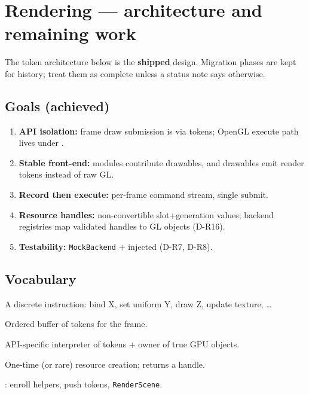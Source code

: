 \section{Rendering --- architecture and remaining work}
\label{sec:rendering-target}

The token architecture below is the \textbf{shipped} design. Migration phases
are kept for history; treat them as complete unless a status note says otherwise.

\subsection{Goals (achieved)}
\begin{enumerate}
  \item \textbf{API isolation:} frame draw submission is via tokens; OpenGL
        execute path lives under .
  \item \textbf{Stable front-end:} modules contribute drawables, and drawables
        emit render tokens instead of raw GL.
  \item \textbf{Record then execute:} per-frame command stream, single submit.
  \item \textbf{Resource handles:} non-convertible slot+generation values;
        backend registries map validated handles to GL objects (D-R16).
  \item \textbf{Testability:} \texttt{MockBackend} + injected 
        (D-R7, D-R8).
\end{enumerate}

\subsection{Vocabulary}
\begin{description}[style=nextline]
  \item[Token / RenderCommand]
    A discrete instruction: bind X, set uniform Y, draw Z, update texture, \ldots
  \item[Command queue]
    Ordered buffer of tokens for the frame.
  \item[Backend]
    API-specific interpreter of tokens + owner of true GPU objects.
  \item[Enrollment]
    One-time (or rare) resource creation; returns a handle.
  \item[Front-end renderer]
    : enroll helpers, push tokens, \texttt{RenderScene}.
\end{description}

